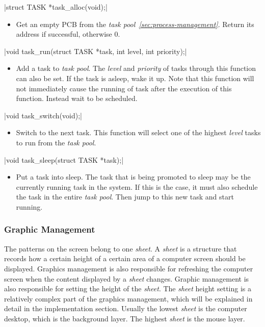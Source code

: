 \documentclass{swfcthesis}
\begin{document}
\csingle|struct TASK *task_alloc(void);|
\begin{itemize}
\item Get an empty PCB from the \emph{task pool~\ref{sec:process-management}}. Return
  its address if successful, otherwise 0. 
  
\end{itemize}

\csingle|void task_run(struct TASK *task, int level, int priority);|
\begin{itemize}
\item Add a task to \emph{task pool}. The \emph{level} and \emph{priority} of tasks
  through this function can also be set. If the task is asleep, wake it up. Note that this
  function will not immediately cause the running of task after the execution of this
  function. Instead wait to be scheduled.
\end{itemize}

\csingle|void task_switch(void);|
\begin{itemize}
\item Switch to the next task. This function will select one of the highest \emph{level}
  tasks to run from the \emph{task pool}. 
  
\end{itemize}

\csingle|void task_sleep(struct TASK *task);|
\begin{itemize}
\item Put a task into sleep. The task that is being promoted to sleep may be the currently
  running task in the system. If this is the case, it must also schedule the task in
  the entire \emph{task pool}. Then jump to this new task and start running.
      
\end{itemize}

\subsubsection{Graphic Management}
\label{sec:graphic}

The patterns on the screen belong to one \emph{sheet}. A \emph{sheet} is a structure that
records how a certain height of a certain area of a computer screen should be
displayed. Graphics management is also responsible for refreshing the computer screen when
the content displayed by a \emph{sheet} changes. Graphic management is also responsible
for setting the height of the \emph{sheet}. The \emph{sheet} height setting is a relatively
complex part of the graphics management, which will be explained in detail in the
implementation section. Usually the lowest \emph{sheet} is the computer desktop, which is the
background layer. The highest \emph{sheet} is the mouse layer. 
\end{document}
